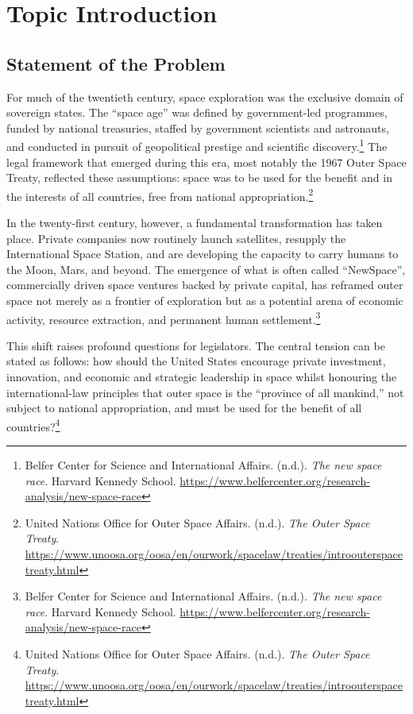 \section{Topic Introduction}

\subsection{Statement of the Problem}

For much of the twentieth century, space exploration was the exclusive domain of sovereign states. The “space age” was defined by government-led programmes, funded by national treasuries, staffed by government scientists and astronauts, and conducted in pursuit of geopolitical prestige and scientific discovery.\footnote{Belfer Center for Science and International Affairs. (n.d.). \emph{The new space race}. Harvard Kennedy School. \url{https://www.belfercenter.org/research-analysis/new-space-race}} The legal framework that emerged during this era, most notably the 1967 Outer Space Treaty, reflected these assumptions: space was to be used for the benefit and in the interests of all countries, free from national appropriation.\footnote{United Nations Office for Outer Space Affairs. (n.d.). \emph{The Outer Space Treaty}. \url{https://www.unoosa.org/oosa/en/ourwork/spacelaw/treaties/introouterspacetreaty.html}}

In the twenty-first century, however, a fundamental transformation has taken place. Private companies now routinely launch satellites, resupply the International Space Station, and are developing the capacity to carry humans to the Moon, Mars, and beyond. The emergence of what is often called “NewSpace”, commercially driven space ventures backed by private capital, has reframed outer space not merely as a frontier of exploration but as a potential arena of economic activity, resource extraction, and permanent human settlement.\footnote{Belfer Center for Science and International Affairs. (n.d.). \emph{The new space race}. Harvard Kennedy School. \url{https://www.belfercenter.org/research-analysis/new-space-race}}

This shift raises profound questions for legislators. The central tension can be stated as follows: how should the United States encourage private investment, innovation, and economic and strategic leadership in space whilst honouring the international-law principles that outer space is the “province of all mankind,” not subject to national appropriation, and must be used for the benefit of all countries?\footnote{United Nations Office for Outer Space Affairs. (n.d.). \emph{The Outer Space Treaty}. \url{https://www.unoosa.org/oosa/en/ourwork/spacelaw/treaties/introouterspacetreaty.html}}


